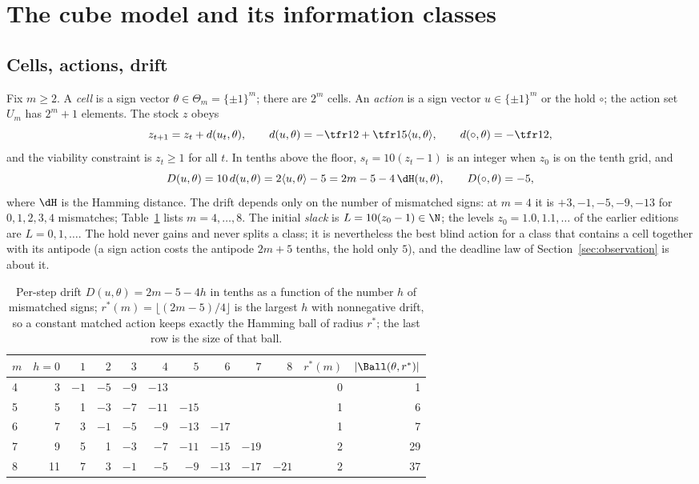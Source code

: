 \section{The cube model and its information classes}\label{sec:model}

\subsection{Cells, actions, drift}
Fix $m\ge2$. A \emph{cell} is a sign vector $\theta\in\Theta_m=\{\pm1\}^m$; there are $2^m$ cells. An \emph{action} is a sign vector $u\in\{\pm1\}^m$ or the hold $\circ$; the action set $U_m$ has $2^m+1$ elements. The stock $z$ obeys
\begin{equation}\label{eq:drift}
z_{t+1}=z_t+d(u_t,\theta),\qquad d(u,\theta)=-\tfr12+\tfr15\langle u,\theta\rangle,\qquad d(\circ,\theta)=-\tfr12,
\end{equation}
and the viability constraint is $z_t\ge1$ for all $t$. In tenths above the floor, $s_t=10(z_t-1)$ is an integer when $z_0$ is on the tenth grid, and
\begin{equation}\label{eq:D}
D(u,\theta)=10\,d(u,\theta)=2\langle u,\theta\rangle-5=2m-5-4\,\dH(u,\theta),\qquad D(\circ,\theta)=-5,
\end{equation}
where $\dH$ is the Hamming distance. The drift depends only on the number of mismatched signs: at $m=4$ it is $+3,-1,-5,-9,-13$ for $0,1,2,3,4$ mismatches; Table~\ref{tab:drift} lists $m=4,\dots,8$. The initial \emph{slack} is $L=10(z_0-1)\in\N$; the levels $z_0=1.0,1.1,\dots$ of the earlier editions are $L=0,1,\dots$. The hold never gains and never splits a class; it is nevertheless the best blind action for a class that contains a cell together with its antipode (a sign action costs the antipode $2m+5$ tenths, the hold only $5$), and the deadline law of Section~\ref{sec:observation} is about it.

\begin{table}[t]
\centering\small
\caption{Per-step drift $D(u,\theta)=2m-5-4h$ in tenths as a function of the number $h$ of mismatched signs; $r^\ast(m)=\lfloor(2m-5)/4\rfloor$ is the largest $h$ with nonnegative drift, so a constant matched action keeps exactly the Hamming ball of radius $r^\ast$; the last row is the size of that ball.}
\label{tab:drift}
\begin{tabular}{lrrrrrrrrr|rr}
\toprule
$m$ & $h{=}0$ & $1$ & $2$ & $3$ & $4$ & $5$ & $6$ & $7$ & $8$ & $r^\ast(m)$ & $|\Ball(\theta,r^\ast)|$\\
\midrule
4 & 3 & $-1$ & $-5$ & $-9$ & $-13$ & & & & & 0 & 1\\
5 & 5 & 1 & $-3$ & $-7$ & $-11$ & $-15$ & & & & 1 & 6\\
6 & 7 & 3 & $-1$ & $-5$ & $-9$ & $-13$ & $-17$ & & & 1 & 7\\
7 & 9 & 5 & 1 & $-3$ & $-7$ & $-11$ & $-15$ & $-19$ & & 2 & 29\\
8 & 11 & 7 & 3 & $-1$ & $-5$ & $-9$ & $-13$ & $-17$ & $-21$ & 2 & 37\\
\bottomrule
\end{tabular}
\end{table}

